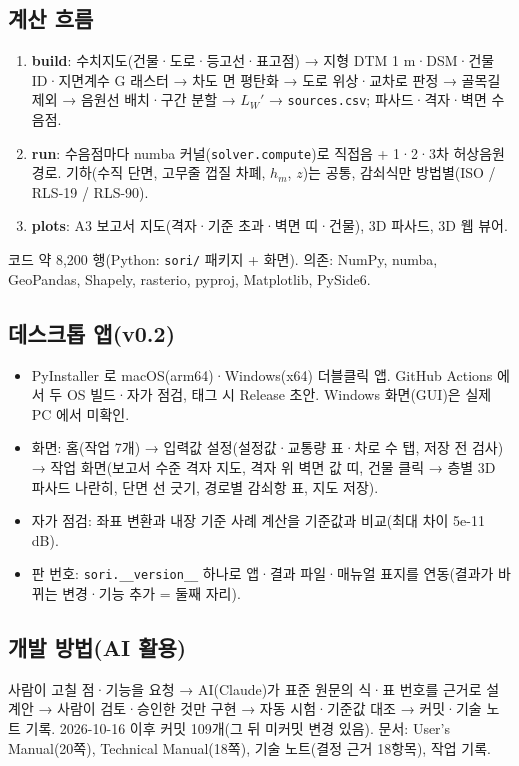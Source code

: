 \documentclass[10pt,a4paper]{article}
\newcommand{\f}[1]{\texttt{#1}}
\begin{document}
\subsection{계산 흐름}
\begin{enumerate}
\item \textbf{build}: 수치지도(건물·도로·등고선·표고점) → 지형 DTM 1 m·DSM·건물 ID·지면계수 G 래스터 → 차도 면 평탄화 → 도로 위상·교차로 판정 → 골목길 제외 → 음원선 배치·구간 분할 → $L_W'$ → \f{sources.csv}; 파사드·격자·벽면 수음점.
\item \textbf{run}: 수음점마다 numba 커널(\f{solver.compute})로 직접음 + 1·2·3차 허상음원 경로. 기하(수직 단면, 고무줄 껍질 차폐, $h_m$, $z$)는 공통, 감쇠식만 방법별(ISO / RLS-19 / RLS-90).
\item \textbf{plots}: A3 보고서 지도(격자·기준 초과·벽면 띠·건물), 3D 파사드, 3D 웹 뷰어.
\end{enumerate}
코드 약 8,200 행(Python: \f{sori/} 패키지 + 화면). 의존: NumPy, numba, GeoPandas, Shapely, rasterio, pyproj, Matplotlib, PySide6.

\subsection{데스크톱 앱(v0.2)}
\begin{itemize}
\item PyInstaller 로 macOS(arm64)·Windows(x64) 더블클릭 앱. GitHub Actions 에서 두 OS 빌드·자가 점검, 태그 시 Release 초안. Windows 화면(GUI)은 실제 PC 에서 미확인.
\item 화면: 홈(작업 7개) → 입력값 설정(설정값·교통량 표·차로 수 탭, 저장 전 검사) → 작업 화면(보고서 수준 격자 지도, 격자 위 벽면 값 띠, 건물 클릭 → 층별 3D 파사드 나란히, 단면 선 긋기, 경로별 감쇠항 표, 지도 저장).
\item 자가 점검: 좌표 변환과 내장 기준 사례 계산을 기준값과 비교(최대 차이 5e-11 dB).
\item 판 번호: \f{sori.\_\_version\_\_} 하나로 앱·결과 파일·매뉴얼 표지를 연동(결과가 바뀌는 변경·기능 추가 = 둘째 자리).
\end{itemize}

\subsection{개발 방법(AI 활용)}
사람이 고칠 점·기능을 요청 → AI(Claude)가 표준 원문의 식·표 번호를 근거로 설계안 → 사람이 검토·승인한 것만 구현 → 자동 시험·기준값 대조 → 커밋·기술 노트 기록. 2026-10-16 이후 커밋 109개(그 뒤 미커밋 변경 있음). 문서: User's Manual(20쪽), Technical Manual(18쪽), 기술 노트(결정 근거 18항목), 작업 기록.
\end{document}
